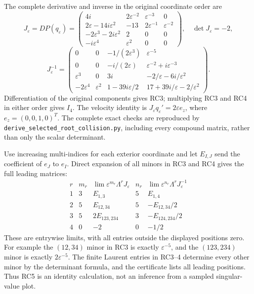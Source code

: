 \documentclass[11pt]{article}
\begin{document}
The complete derivative and inverse in the original coordinate order
are
\[
 J_\varepsilon=DP(q_\varepsilon)=
 \begin{pmatrix}
 4i&2\varepsilon^{-2}&\varepsilon^{-3}&0\\
 2\varepsilon-14i\varepsilon^2&-13&2\varepsilon^{-1}&\varepsilon^{-2}\\
 -2\varepsilon^3-2i\varepsilon^2&2&0&0\\
 -i\varepsilon^4&\varepsilon^2&0&0
 \end{pmatrix},\quad\det J_\varepsilon=-2, \tag{RC3}
\]
\[
 J_\varepsilon^{-1}=
 \begin{pmatrix}
 0&0&-1/(2\varepsilon^3)&\varepsilon^{-5}\\
 0&0&-i/(2\varepsilon)&\varepsilon^{-2}+i\varepsilon^{-3}\\
 \varepsilon^3&0&3i&-2/\varepsilon-6i/\varepsilon^2\\
 -2\varepsilon^4&\varepsilon^2&1-39i\varepsilon/2&
                  17+39i/\varepsilon-2/\varepsilon^2
 \end{pmatrix}. \tag{RC4}
\]
Differentiation of the original components gives RC3; multiplying
RC3 and RC4 in either order gives $I_4$. The velocity identity is
$J_\varepsilon q_\varepsilon'=2\varepsilon e_z$, where
$e_z=(0,0,1,0)^T$. The complete exact checks are reproduced by
\texttt{derive\_selected\_root\_collision.py}, including every
compound matrix, rather than only the scalar determinant.

Use increasing multi-indices for each exterior coordinate and let
$E_{I,J}$ send the coefficient of $e_J$ to $e_I$. Direct expansion
of all minors in RC3 and RC4 gives the full leading matrices:
\[
 \begin{array}{c|c|c|c|c}
 r& m_r&\lim\varepsilon^{m_r}\Lambda^rJ_\varepsilon&
        n_r&\lim\varepsilon^{n_r}\Lambda^rJ_\varepsilon^{-1}\\\hline
 1&3&E_{1,3}&5&E_{1,4}\\
 2&5&E_{12,34}&5&-E_{12,34}/2\\
 3&5&2E_{123,234}&3&-E_{124,234}/2\\
 4&0&-2&0&-1/2
 \end{array} \tag{RC5}
\]
These are entrywise limits, with all entries outside the displayed
positions zero. For example the $(12,34)$ minor in RC3 is exactly
$\varepsilon^{-5}$, and the $(123,234)$ minor is exactly
$2\varepsilon^{-5}$. The finite Laurent entries in RC3--4 determine
every other minor by the determinant formula, and the certificate
lists all leading positions. Thus RC5 is an identity calculation,
not an inference from a sampled singular-value plot.
\end{document}
